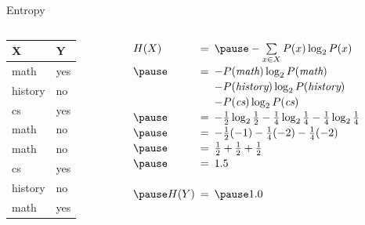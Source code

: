 \documentclass[14pt]{beamer}
\begin{document}
\begin{frame}{Entropy}
\begin{columns}
\begin{column}{0.25\textwidth}
\begin{tabular}{ll}
X       & Y   \\
\hline
math    & yes \\
history & no  \\
cs      & yes \\
math    & no  \\
math    & no  \\
cs      & yes \\
history & no  \\
math    & yes \\
\end{tabular}
\end{column}
\begin{column}{0.7\textwidth}
\pause
$
\extrarowheight=2pt
\setlength{\arraycolsep}{0.25em}
\begin{array}{ l l l }
H(X)        & = & \pause -\sum\limits_{x \in X}P(x)\log_2 P(x) \\
     \pause & = & -P(\textit{math})\log_2 P(\textit{math}) \\
            &   & -P(\textit{history})\log_2 P(\textit{history}) \\
            &   & -P(\textit{cs})\log_2 P(\textit{cs}) \\
     \pause & = & -\frac{1}{2}\log_2\frac{1}{2} 
                  -\frac{1}{4}\log_2\frac{1}{4}
                  -\frac{1}{4}\log_2\frac{1}{4} \\
     \pause & = & -\frac{1}{2}(-1) - \frac{1}{4}(-2) - \frac{1}{4}(-2) \\
     \pause & = & \frac{1}{2} + \frac{1}{2} + \frac{1}{2} \\
     \pause & = & 1.5 \\
\\
\pause
H(Y)        & = & \pause 1.0 \\
\end{array}
$
\end{column}
\end{columns}
\end{frame}
\end{document}
